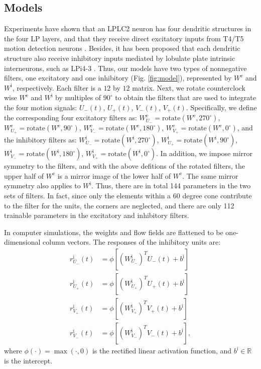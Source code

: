 \documentclass[pdftex,9pt,lineno]{elife}
\begin{document}
\subsection{Models}
Experiments have shown that an LPLC2 neuron has four dendritic structures in the four LP layers, and that they receive direct excitatory inputs from T4/T5 motion detection neurons \citep{maisak2013directional,klapoetke2017ultra}. Besides, it has been proposed that each dendritic structure also receive inhibitory inputs mediated by lobulate plate intrinsic interneurons, such as LPi4-3 \citep{klapoetke2017ultra}. Thus, our models have two types of nonnegative filters, one excitatory and one inhibitory (Fig. \ref{fig:model}), represented by $W^{\text{e}}$ and $W^{\text{i}}$, respectively. Each filter is a $12$ by $12$ matrix. Next, we rotate counterclock wise $W^{\text{e}}$ and $W^{\text{i}}$ by multiples of $90^{\circ}$ to obtain the filters that are used to integrate the four motion signals: $U_{-}(t)$, $U_{+}(t)$, $V_{-}(t)$, $V_{+}(t)$. Specifically, we define the corresponding four excitatory filters as: $W^{\text{e}}_{U_{-}}=\text{rotate}(W^{\text{e}},270^{\circ})$, $W^{\text{e}}_{U_{+}}=\text{rotate}(W^{\text{e}},90^{\circ})$, $W^{\text{e}}_{V_{-}}=\text{rotate}(W^{\text{e}},180^{\circ})$, $W^{\text{e}}_{V_{+}}=\text{rotate}(W^{\text{e}},0^{\circ})$, and the inhibitory filters as: $W^{\text{i}}_{U_{-}}=\text{rotate}(W^{\text{i}},270^{\circ})$, $W^{\text{i}}_{U_{+}}=\text{rotate}(W^{\text{i}},90^{\circ})$, $W^{\text{i}}_{V_{-}}=\text{rotate}(W^{\text{i}},180^{\circ})$, $W^{\text{i}}_{V_{+}}=\text{rotate}(W^{\text{i}},0^{\circ})$. In addition, we impose mirror symmetry to the filters, and with the above defitions of the rotated filters, the upper half of $W^{\text{e}}$ is a mirror image of the lower half of $W^{\text{e}}$. The same mirror symmetry also applies to $W^{\text{i}}$. Thus, there are in total 144 parameters in the two sets of filters. In fact, since only the elements within a 60 degree cone contribute to the filter for the units, the corners are neglected, and there are only 112 trainable parameters in the excitatory and inhibitory filters.

In computer simulations, the weights and flow fields are flattened to be one-dimensional column vectors. The responses of the inhibitory units are:
\begin{align*}
r^{\text{i}}_{U_{-}}(t) &= \phi \left[ (W^{\text{i}}_{U_{-}})^{T}U_{-}(t)+b^{\text{i}} \right] \nonumber \\
r^{\text{i}}_{U_{+}}(t) &= \phi \left[ (W^{\text{i}}_{U_{+}})^{T}U_{+}(t)+b^{\text{i}} \right] \nonumber \\
r^{\text{i}}_{V_{+}}(t) &= \phi \left[ (W^{\text{i}}_{V_{+}})^{T}V_{+}(t)+b^{\text{i}} \right] \nonumber \\
r^{\text{i}}_{V_{-}}(t) &= \phi \left[ (W^{\text{i}}_{V_{-}})^{T}V_{-}(t)+b^{\text{i}} \right],
\end{align*}
where $\phi(\cdot) = \max(\cdot,0)$ is the rectified linear activation function, and $b^{\text{i}} \in \mathbb{R}$ is the intercept.
\end{document}

